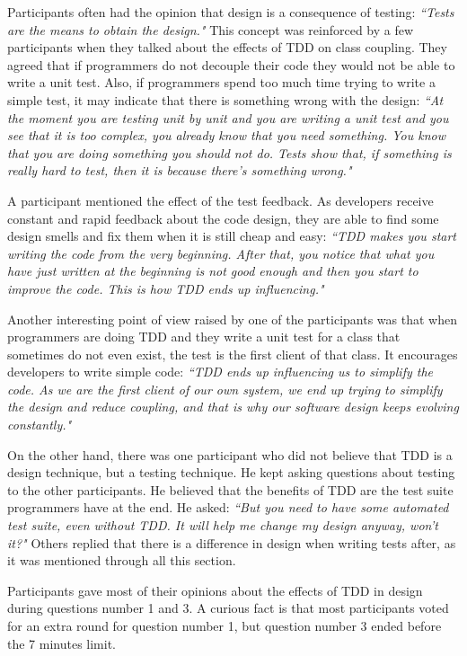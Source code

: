 Participants often had the opinion that design is a consequence of testing: 
\textit{``Tests are the means to obtain the design."}
This concept was reinforced by a few participants when they talked about the
effects of TDD on class coupling. They agreed that if programmers do not
decouple their code they would not be able to write a unit test. Also, if
programmers spend too much time trying to write a simple test, it may
indicate that there is something wrong with the design: \textit{``At the moment
you are testing unit by unit and you are writing a unit test and you see that
it is too complex, you already know that you need something. You know that you
are doing something you should not do. Tests show that, if something is really
hard to test, then it is because there's something wrong."}

A participant mentioned the effect of the test feedback. 
As developers receive constant and rapid feedback about the code design,
they are able to find some design smells and fix them when it is still cheap and
easy:
\textit{``TDD makes you start writing the code from the very beginning. After
that, you notice that what you have just written at the beginning is not good
enough and then you start to improve the code. This is how TDD ends up
influencing."}

Another interesting point of view raised by one of the participants was that
when programmers are doing TDD and they write a unit test for a class that
sometimes do not even exist, the test is the first client of that class. It
encourages developers to write simple code:
 \textit{``TDD ends up influencing us to simplify the code. As we are the
first client of our own system, we end up trying to simplify the design and
reduce coupling, and that is why our software design keeps evolving
constantly."}

On the other hand, there was one participant who did not believe that TDD is a
design technique, but a testing technique. He kept asking questions about
testing to the other participants. He believed that the benefits of TDD are the
test suite programmers have at the end. He asked: \textit{``But you need to
have some automated test suite, even without TDD. It will help me change my
design anyway, won't it?"}
Others replied that there is a difference in design when writing tests after,
as it was mentioned through all this section.

Participants gave most of their opinions about the effects of TDD in design 
during questions number 1 and 3. 
A curious fact is that most participants voted for an extra round for
question number 1, but question number 3 ended before the 7 minutes limit.

